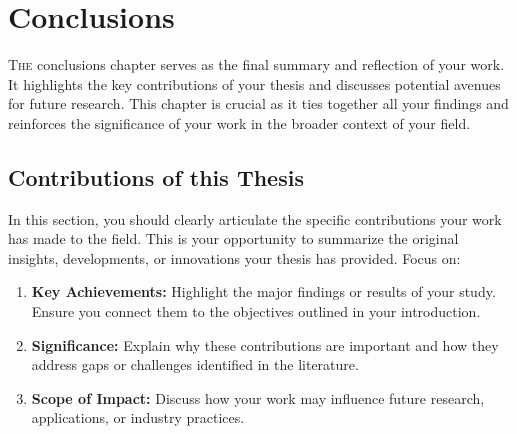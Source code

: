 %
%
%
%
%
%

\chapter{Conclusions}\label{chap:conclusions}
\lettrine[lines=3]{T}{he} conclusions chapter serves as the final summary and reflection of your work. It highlights the key contributions of your thesis and discusses potential avenues for future research. This chapter is crucial as it ties together all your findings and reinforces the significance of your work in the broader context of your field.

\section{Contributions of this Thesis}
\noindent In this section, you should clearly articulate the specific contributions your work has made to the field. This is your opportunity to summarize the original insights, developments, or innovations your thesis has provided. Focus on:
\begin{enumerate}
    \item \textbf{Key Achievements:} Highlight the major findings or results of your study. Ensure you connect them to the objectives outlined in your introduction.
    \item \textbf{Significance:} Explain why these contributions are important and how they address gaps or challenges identified in the literature.
    \item \textbf{Scope of Impact:} Discuss how your work may influence future research, applications, or industry practices.
\end{enumerate}

